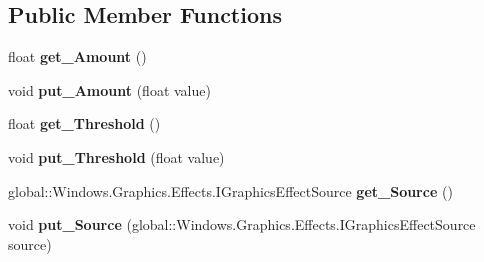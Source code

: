 \subsection*{Public Member Functions}
\begin{DoxyCompactItemize}
\item 
\mbox{\label{interface_microsoft_1_1_graphics_1_1_canvas_1_1_effects_1_1_i_sharpen_effect_a2643bf30d314aa459a4d7474614c50f2}} 
float {\bfseries get\+\_\+\+Amount} ()
\item 
\mbox{\label{interface_microsoft_1_1_graphics_1_1_canvas_1_1_effects_1_1_i_sharpen_effect_a3bb5e7555e2d740ab9cff31346d7c9d0}} 
void {\bfseries put\+\_\+\+Amount} (float value)
\item 
\mbox{\label{interface_microsoft_1_1_graphics_1_1_canvas_1_1_effects_1_1_i_sharpen_effect_a0bdc7c0a125711a93f0dd7328f8ca6a0}} 
float {\bfseries get\+\_\+\+Threshold} ()
\item 
\mbox{\label{interface_microsoft_1_1_graphics_1_1_canvas_1_1_effects_1_1_i_sharpen_effect_ab405cc7627dfb79867beeddb90d99055}} 
void {\bfseries put\+\_\+\+Threshold} (float value)
\item 
\mbox{\label{interface_microsoft_1_1_graphics_1_1_canvas_1_1_effects_1_1_i_sharpen_effect_a93ca76a1c96c847cbdeef3cc82a68ac6}} 
global\+::\+Windows.\+Graphics.\+Effects.\+I\+Graphics\+Effect\+Source {\bfseries get\+\_\+\+Source} ()
\item 
\mbox{\label{interface_microsoft_1_1_graphics_1_1_canvas_1_1_effects_1_1_i_sharpen_effect_a88842ec0c36e706f81b03ed1a74748d2}} 
void {\bfseries put\+\_\+\+Source} (global\+::\+Windows.\+Graphics.\+Effects.\+I\+Graphics\+Effect\+Source source)
\item 
\mbox{\label{interface_microsoft_1_1_graphics_1_1_canvas_1_1_effects_1_1_i_sharpen_effect_a2643bf30d314aa459a4d7474614c50f2}} 

\end{DoxyCompactItemize}
